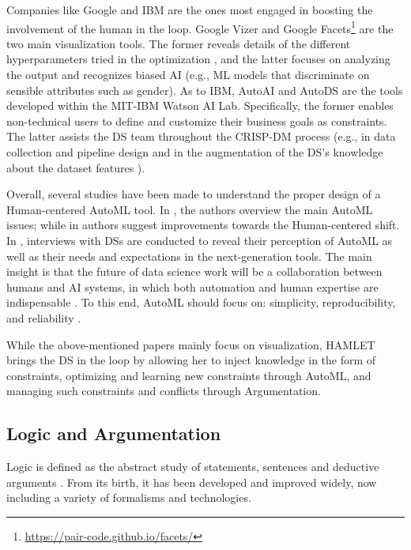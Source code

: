 \documentclass[5p,times]{elsarticle}
\begin{document}
Companies like Google and IBM are the ones most engaged in boosting the involvement of the human in the loop.
Google Vizer \cite{golovin2017google} and Google Facets\footnote{\url{https://pair-code.github.io/facets/}} are the two main visualization tools.
The former reveals details of the different hyperparameters tried in the optimization \cite{golovin2017google}, and the latter focuses on analyzing the output and recognizes biased AI (e.g., ML models that discriminate on sensible attributes such as gender).
As to IBM, AutoAI \cite{wang2020autoai} and AutoDS \cite{wang2021autods} are the tools developed within the MIT-IBM Watson AI Lab.
Specifically, the former enables non-technical users to define and customize their business goals as constraints. 
The latter assists the DS team throughout the CRISP-DM process (e.g., in data collection and pipeline design \cite{muller2019data, wang2021autods} and in the augmentation of the DS's knowledge about the dataset features \cite{drozdal2020trust}).

Overall, several studies have been made to understand the proper design of a Human-centered AutoML tool.
In \cite{pfisterer2019towards}, the authors overview the main AutoML issues; while in \cite{khuat2022roles} authors suggest improvements towards the Human-centered shift.
In \cite{gil2019towards, XinWLSP21automationml, crisan2021fits}, interviews with DSs are conducted to reveal their perception of AutoML as well as their needs and expectations in the next-generation tools.
The main insight is that the future of data science work will be a collaboration between humans and AI systems, in which both automation and human expertise are indispensable \cite{wang2019human}.
To this end, AutoML should focus on: simplicity, reproducibility, and reliability \cite{XinWLSP21automationml, crisan2021fits}.

While the above-mentioned papers mainly focus on visualization, HAMLET brings the DS in the loop by allowing her to inject knowledge in the form of constraints, optimizing and learning new constraints through AutoML, and managing such constraints and conflicts through Argumentation.

\subsection{Logic and Argumentation}\label{logic}
Logic is defined as the abstract study of statements, sentences and deductive arguments \cite{Paulson2018logichistory}.
From its birth, it has been developed and improved widely, now including a variety of formalisms and technologies.
\end{document}
